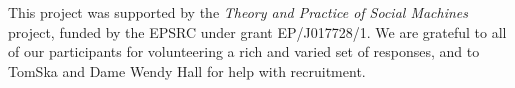 \documentclass{sig-alternate}
\begin{document}
This project was supported by the \emph{Theory and Practice of Social Machines} project, funded by the EPSRC under grant EP/J017728/1. We are grateful to all of our participants for volunteering a rich and varied set of responses, and to TomSka and Dame Wendy Hall for help with recruitment.

% 

%
%
\balancecolumns
\end{document}
